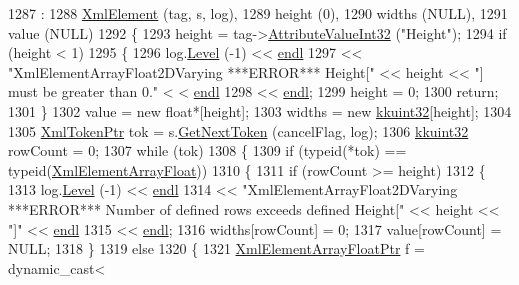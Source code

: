 \begin{DoxyCode}
1287                                                              :
1288     \hyperlink{class_k_k_b_1_1_xml_element_a66317eff5bd3abcc60755756ba2887d5}{XmlElement} (tag, s, log),
1289     height (0),
1290     widths (NULL),
1291     value  (NULL)
1292 \{
1293   height = tag->\hyperlink{class_k_k_b_1_1_xml_tag_acbbfaeaf55fd15e4f563a71a1b4fa456}{AttributeValueInt32} (\textcolor{stringliteral}{"Height"});
1294   \textcolor{keywordflow}{if}  (height < 1)
1295   \{
1296     log.\hyperlink{class_k_k_b_1_1_run_log_a32cf761d7f2e747465fd80533fdbb659}{Level} (-1) << \hyperlink{namespace_k_k_b_ad1f50f65af6adc8fa9e6f62d007818a8}{endl} 
1297       << \textcolor{stringliteral}{"XmlElementArrayFloat2DVarying   ***ERROR***   Height["} << height << \textcolor{stringliteral}{"] must be greater than 0."} <
      < \hyperlink{namespace_k_k_b_ad1f50f65af6adc8fa9e6f62d007818a8}{endl} 
1298       << \hyperlink{namespace_k_k_b_ad1f50f65af6adc8fa9e6f62d007818a8}{endl};
1299     height = 0;
1300     \textcolor{keywordflow}{return};
1301   \}
1302   value  = \textcolor{keyword}{new} \textcolor{keywordtype}{float}*[height];
1303   widths = \textcolor{keyword}{new} \hyperlink{namespace_k_k_b_af8d832f05c54994a1cce25bd5743e19a}{kkuint32}[height];
1304 
1305   \hyperlink{class_k_k_b_1_1_xml_token}{XmlTokenPtr}  tok = s.\hyperlink{class_k_k_b_1_1_xml_stream_a87cc738b05c666cf5d5c25beaab477b4}{GetNextToken} (cancelFlag, log);
1306   \hyperlink{namespace_k_k_b_af8d832f05c54994a1cce25bd5743e19a}{kkuint32}  rowCount = 0;
1307   \textcolor{keywordflow}{while}  (tok)
1308   \{
1309     \textcolor{keywordflow}{if}  (\textcolor{keyword}{typeid}(*tok) == \textcolor{keyword}{typeid}(\hyperlink{class_k_k_b_1_1_xml_element_array_float}{XmlElementArrayFloat}))
1310     \{
1311       \textcolor{keywordflow}{if}  (rowCount >= height)
1312       \{
1313         log.\hyperlink{class_k_k_b_1_1_run_log_a32cf761d7f2e747465fd80533fdbb659}{Level} (-1) << \hyperlink{namespace_k_k_b_ad1f50f65af6adc8fa9e6f62d007818a8}{endl}
1314           << \textcolor{stringliteral}{"XmlElementArrayFloat2DVarying   ***ERROR***   Number of defined rows exceeds defined Height["}
       << height << \textcolor{stringliteral}{"]"} << \hyperlink{namespace_k_k_b_ad1f50f65af6adc8fa9e6f62d007818a8}{endl}
1315           << \hyperlink{namespace_k_k_b_ad1f50f65af6adc8fa9e6f62d007818a8}{endl};
1316         widths[rowCount] = 0;
1317         value[rowCount]  = NULL;
1318       \}
1319       \textcolor{keywordflow}{else}
1320       \{
1321         \hyperlink{class_k_k_b_1_1_xml_element_array_float}{XmlElementArrayFloatPtr} f = \textcolor{keyword}{dynamic\_cast<}

\end{DoxyCode}
